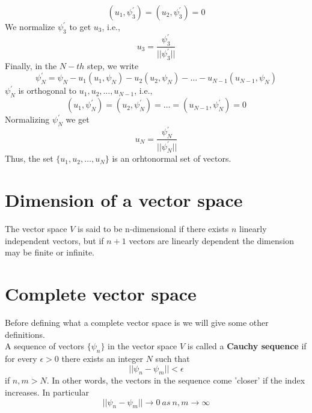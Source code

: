 \begin{equation}\label{eqn:2.79}
(u_1, \psi_3^\prime) = (u_2, \psi_3^\prime) = 0
\end{equation}
We normalize $\psi_3^\prime$ to get $u_3$, i.e.,
\begin{equation}\label{eqn:2.80}
u_3 = \frac{\psi_3^\prime}{||\psi_3^\prime ||}
\end{equation}
Finally, in the $N-th$ step, we write
\begin{equation}\label{eqn:2.81}
\psi_N^\prime = \psi_N - u_1(u_1, \psi_N) - u_2(u_2, \psi_N) - \ldots - u_{N-1}(u_{N-1}, \psi_N)
\end{equation}
$\psi_N^\prime$ is orthogonal to $u_1, u_2, \ldots, u_{N-1}$, i.e.,
\begin{equation}\label{eqn:2.82}
(u_1, \psi_N^\prime) = (u_2, \psi_N^\prime) = \ldots = (u_{N-1}, \psi_N^\prime) = 0
\end{equation}
Normalizing $\psi_N^\prime$ we get
\begin{equation}\label{eqn:2.83}
u_N = \frac{\psi_N^\prime}{||\psi_N^\prime ||}
\end{equation}
Thus, the set $\{u_1, u_2, \ldots, u_N\}$ is an orhtonormal set of vectors.

\section{Dimension of a vector space}
The vector space $V$ is said to be n-dimensional if there exists $n$ linearly independent vectors, but if $n+1$ vectors are linearly dependent the dimension may be finite or infinite.

\section{Complete vector space}
Before defining what a complete vector space is we will give some other definitions.\\
A sequence of vectors $\{\psi_n\}$ in the vector space $V$ is called a \textbf{Cauchy sequence} if for every $\epsilon > 0$ there exists an integer $N$ such that
\begin{equation}\label{eqn:2.84}
||\psi_n - \psi_m || < \epsilon
\end{equation}
if $n, m > N$. In other words, the vectors in the sequence come 'closer' if the index increases. In particular
\begin{equation}\label{eqn:2.85}
||\psi_n - \psi_m || \rightarrow 0 \ as \ n,m \rightarrow \infty
\end{equation}


